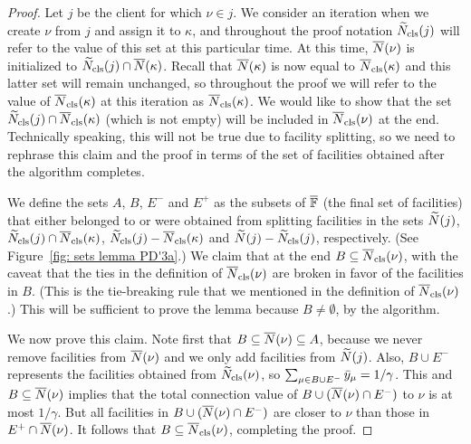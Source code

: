 \begin{proof}
Let $j$ be the client for which $\nu\in j$. We consider an iteration when we create $\nu$
from $j$ and assign it to $\kappa$, and throughout the proof notation ${\widetilde N}_{\text{cls}}(j)$ 
will refer to the value of this set at this particular time.
At this time, ${\overline{N}}(\nu)$ is initialized to ${\widetilde N}_{\text{cls}}(j)\cap {\overline{N}}(\kappa)$.
Recall that
${\overline{N}}(\kappa)$ is now equal to ${\overline{N}}_{\text{cls}}(\kappa)$ and this latter set will remain unchanged,
so throughout the proof we will refer to the value of ${\overline{N}}_{\text{cls}}(\kappa)$ at this iteration
as ${\overline{N}}_{\text{cls}}(\kappa)$.
We would like to show that the set ${\widetilde N}_{\text{cls}}(j)\cap {\overline{N}}_{\text{cls}}(\kappa)$ (which is
not empty) will
be included in ${\overline{N}}_{\text{cls}}(\nu)$ at the end. Technically speaking, this will not be
true due to facility splitting, so we need to rephrase this claim and the proof
in terms of the set of facilities obtained after the algorithm completes.


We define the sets $A$, $B$, $E^-$ and $E^+$ as the subsets of $\overline{\mathbb{F}}$ (the final set
of facilities) that either belonged to or were obtained from splitting facilities in
the sets ${\widetilde N}(j)$, ${\widetilde N}_{\text{cls}}(j)\cap {\overline{N}}_{\text{cls}}(\kappa)$, 
${\widetilde N}_{\text{cls}}(j) - {\overline{N}}_{\text{cls}}(\kappa)$
and ${\widetilde N}(j) - {\widetilde N}_{\text{cls}}(j)$, respectively.
(See Figure~\ref{fig: sets lemma PD'3a}.)
We claim that at the end $B\subseteq {\overline{N}}_{\text{cls}}(\nu)$, with the caveat that the
ties in the definition of ${\overline{N}}_{\text{cls}}(\nu)$ are broken in favor of the facilities in $B$.
(This is the tie-breaking rule that we mentioned in the definition of ${\overline{N}}_{\text{cls}}(\nu)$.)
This will be sufficient to prove the lemma because $B\neq\emptyset$, by the algorithm.

We now prove this claim. Note first that 
$B\subseteq {\overline{N}}(\nu) \subseteq A$, because we never remove facilities from
${\overline{N}}(\nu)$ and we only add facilities from ${\widetilde N}(j)$.
Also, $B\cup E^-$ represents the facilities obtained from ${\widetilde N}_{\text{cls}}(\nu)$, so
 $\sum_{\mu\in B\cup E^-} {\bar y}_{\mu} = 1/\gamma$. 
This and
$B\subseteq {\overline{N}}(\nu)$ implies that the total connection value of
$B\cup ({\overline{N}}(\nu)\cap E^-)$ to $\nu$ is at most $1/\gamma$. But
all facilities in $B\cup ({\overline{N}}(\nu)\cap E^-)$ are closer to $\nu$ than
those in $E^+\cap {\overline{N}}(\nu)$. It follows that
$B\subseteq {\overline{N}}_{\text{cls}}(\nu)$, completing the proof.
\end{proof}


